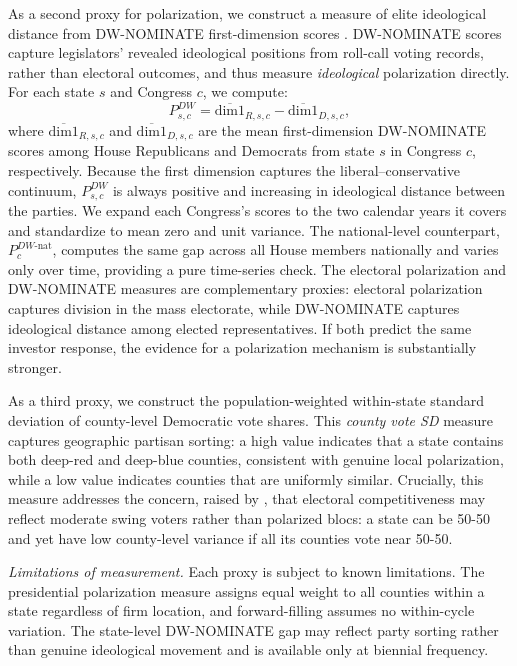 \documentclass[12pt]{article}
\begin{document}
As a second proxy for polarization, we construct a measure of elite ideological
distance from DW-NOMINATE first-dimension scores \citep{poole1997,poole2007}.
DW-NOMINATE scores capture legislators' revealed ideological positions from
roll-call voting records, rather than electoral outcomes, and thus measure
\emph{ideological} polarization directly. For each state $s$ and Congress $c$,
we compute:
\begin{equation}
    \label{eq:dw}
    P^{DW}_{s,c} = \overline{\text{dim1}}_{R,s,c}
    - \overline{\text{dim1}}_{D,s,c},
\end{equation}
where $\overline{\text{dim1}}_{R,s,c}$ and $\overline{\text{dim1}}_{D,s,c}$
are the mean first-dimension DW-NOMINATE scores among House Republicans and
Democrats from state $s$ in Congress $c$, respectively. Because the first
dimension captures the liberal--conservative continuum, $P^{DW}_{s,c}$ is
always positive and increasing in ideological distance between the parties.
We expand each Congress's scores to the two calendar years it covers and
standardize to mean zero and unit variance. The national-level counterpart,
$P^{DW\text{-nat}}_{c}$, computes the same gap across all House members
nationally and varies only over time, providing a pure time-series check.
The electoral polarization and DW-NOMINATE measures are complementary proxies:
electoral polarization captures division in the mass electorate, while
DW-NOMINATE captures ideological distance among elected representatives.
If both predict the same investor response, the evidence for a polarization
mechanism is substantially stronger.

As a third proxy, we construct the population-weighted within-state standard
deviation of county-level Democratic vote shares. This \emph{county vote SD}
measure captures geographic partisan sorting: a high value indicates that a
state contains both deep-red and deep-blue counties, consistent with genuine
local polarization, while a low value indicates counties that are uniformly
similar. Crucially, this measure addresses the concern, raised by
\citet{fiorina2005}, that electoral competitiveness may reflect moderate
swing voters rather than polarized blocs: a state can be 50-50 and yet
have low county-level variance if all its counties vote near 50-50.

\smallskip
\noindent\textit{Limitations of measurement.} Each proxy is subject to
known limitations. The presidential polarization measure assigns equal
weight to all counties within a state regardless of firm location, and
forward-filling assumes no within-cycle variation. The state-level DW-NOMINATE
gap may reflect party sorting rather than genuine ideological movement and
is available only at biennial frequency.
\end{document}
